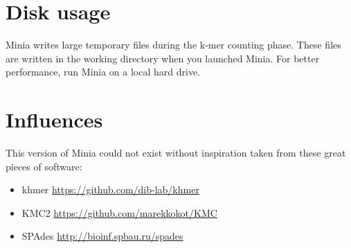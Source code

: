 \documentclass[a4paper]{article}
\begin{document}
\section{Disk usage}

Minia writes large temporary files during the k-mer counting phase. These files are written in the working directory when you launched Minia. For better performance, run Minia on a local hard drive. 

\section{Influences}

This version of Minia could not exist without inspiration taken from these great pieces of software:
\begin{itemize}
    \item khmer \url{https://github.com/dib-lab/khmer}
    \item KMC2 \url{https://github.com/marekkokot/KMC}
    \item SPAdes \url{http://bioinf.spbau.ru/spades}
\end{itemize}
\end{document}

